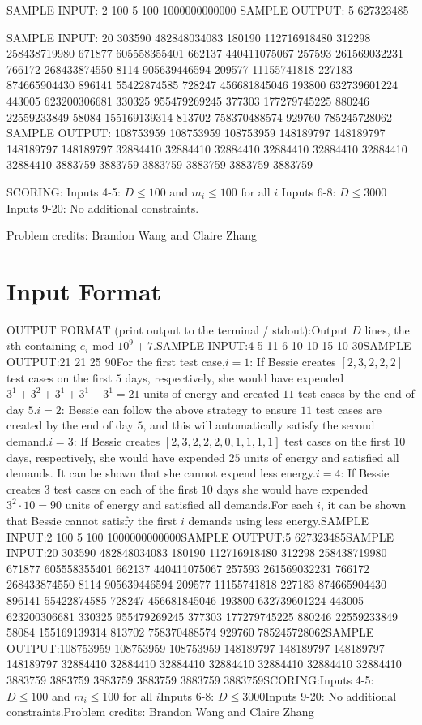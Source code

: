 \documentclass[12pt]{article}
\begin{document}
SAMPLE INPUT:
2
100 5
100 1000000000000
SAMPLE OUTPUT: 
5
627323485

SAMPLE INPUT:
20
303590 482848034083
180190 112716918480
312298 258438719980
671877 605558355401
662137 440411075067
257593 261569032231
766172 268433874550
8114 905639446594
209577 11155741818
227183 874665904430
896141 55422874585
728247 456681845046
193800 632739601224
443005 623200306681
330325 955479269245
377303 177279745225
880246 22559233849
58084 155169139314
813702 758370488574
929760 785245728062
SAMPLE OUTPUT: 
108753959
108753959
108753959
148189797
148189797
148189797
148189797
32884410
32884410
32884410
32884410
32884410
32884410
32884410
3883759
3883759
3883759
3883759
3883759
3883759

SCORING:
Inputs 4-5: $D\le 100$ and $m_i \le 100$ for all $i$ Inputs 6-8: $D\le 3000$Inputs 9-20: No additional constraints.


Problem credits: Brandon Wang and Claire Zhang



\section*{Input Format}
OUTPUT FORMAT (print output to the terminal / stdout):Output $D$ lines, the $i$th containing $e_i \text{ mod } 10^9+7$.SAMPLE INPUT:4
5 11
6 10
10 15
10 30SAMPLE OUTPUT:21
21
25
90For the first test case,$i=1$: If Bessie creates $[2, 3, 2, 2, 2]$ test cases on the first $5$
days, respectively, she would have expended $3^1 + 3^2 + 3^1 + 3^1 + 3^1 = 21$
units of energy and created $11$ test cases by the end of day $5$.$i=2$: Bessie can follow the above strategy to ensure $11$ test cases are
created by the end of day $5$, and this will automatically satisfy the second
demand.$i=3$: If Bessie creates $[2, 3, 2, 2, 2, 0, 1, 1, 1, 1]$ test
cases on the first $10$ days, respectively, she would have expended $25$ units
of energy and satisfied all demands. It can be shown that she cannot expend less
energy.$i=4$: If Bessie creates 3 test cases on each of the first
$10$ days she would have expended $3^{2}\cdot 10 = 90$ units of energy and
satisfied all demands.For each $i$, it can be shown that Bessie cannot satisfy the first $i$ demands using
less energy.SAMPLE INPUT:2
100 5
100 1000000000000SAMPLE OUTPUT:5
627323485SAMPLE INPUT:20
303590 482848034083
180190 112716918480
312298 258438719980
671877 605558355401
662137 440411075067
257593 261569032231
766172 268433874550
8114 905639446594
209577 11155741818
227183 874665904430
896141 55422874585
728247 456681845046
193800 632739601224
443005 623200306681
330325 955479269245
377303 177279745225
880246 22559233849
58084 155169139314
813702 758370488574
929760 785245728062SAMPLE OUTPUT:108753959
108753959
108753959
148189797
148189797
148189797
148189797
32884410
32884410
32884410
32884410
32884410
32884410
32884410
3883759
3883759
3883759
3883759
3883759
3883759SCORING:Inputs 4-5: $D\le 100$ and $m_i \le 100$ for all $i$Inputs 6-8: $D\le 3000$Inputs 9-20: No additional constraints.Problem credits: Brandon Wang and Claire Zhang
\end{document}

